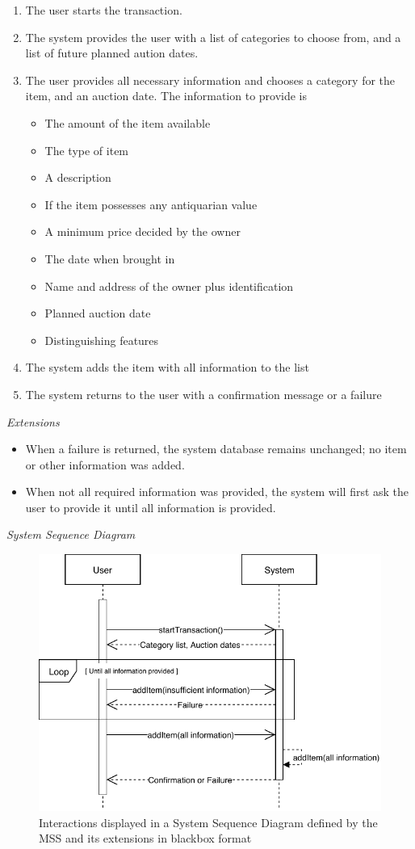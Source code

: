 \documentclass{article}
\begin{document}
\begin{enumerate}[noitemsep]
	\item The user starts the transaction.
	\item The system provides the user with a list of categories to choose from, and a list of future planned aution dates.
	\item The user provides all necessary information and chooses a category for the item, and an auction date. The information to provide is
	\begin{itemize}[noitemsep]
		\item The amount of the item available
		\item The type of item
		\item A description
		\item If the item possesses any antiquarian value
		\item A minimum price decided by the owner
		\item The date when brought in
		\item Name and address of the owner plus identification
		\item Planned auction date
		\item Distinguishing features
	\end{itemize}
	\item The system adds the item with all information to the list
	\item The system returns to the user with a confirmation message or a failure
\end{enumerate}
\textsl{Extensions}
\begin{itemize}[noitemsep]
	\item When a failure is returned, the system database remains unchanged; no item or other information was added.
	\item When not all required information was provided, the system will first ask the user to provide it until all information is provided.
\end{itemize}
\textsl{System Sequence Diagram}
\begin{figure}[H]
	\centering
	\includegraphics[scale=1]{SD-bb-create.pdf}
	\caption*{Interactions displayed in a System Sequence Diagram defined by the MSS and its extensions in blackbox format}
\end{figure}
\end{document}
